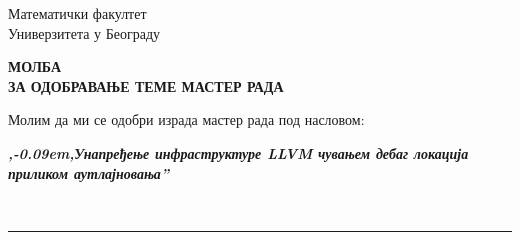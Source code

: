 \documentclass[a4paper]{article}
\def\zn{,\kern-0.09em,}
\begin{document}
\thispagestyle{empty}

\begin{flushleft}
Математички факултет\\
Универзитета у Београду
\end{flushleft}

\bigskip

\begin{center}
\textbf{МОЛБА\\
ЗА ОДОБРАВАЊЕ ТЕМЕ МАСТЕР РАДА
}\end{center}

\bigskip

\begin{flushleft}
Молим да ми се одобри израда мастер рада под насловом:
\end{flushleft}

\begin{minipage}{16.5cm}
\textbf{\textit{\zn Унапређење инфраструктуре LLVM чувањем дебаг локација приликом аутлајновања''}}
\end{minipage}\\
\rule[4mm]{17.5cm}{.05mm}
\end{document}
